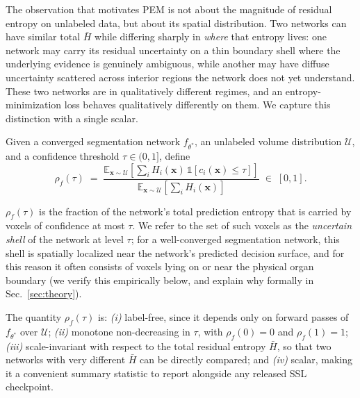 The observation that motivates PEM is not about the magnitude of residual entropy on unlabeled data, but about its spatial distribution. Two networks can have similar total $\bar H$ while differing sharply in \emph{where} that entropy lives: one network may carry its residual uncertainty on a thin boundary shell where the underlying evidence is genuinely ambiguous, while another may have diffuse uncertainty scattered across interior regions the network does not yet understand. These two networks are in qualitatively different regimes, and an entropy-minimization loss behaves qualitatively differently on them. We capture this distinction with a single scalar.

\begin{definition}
\label{def:rho}
Given a converged segmentation network $f_{\theta^*}$, an unlabeled volume distribution $\mathcal{U}$, and a confidence threshold $\tau \in (0, 1]$, define
\begin{equation}
\rho_f(\tau) \;=\; \frac{\mathbb{E}_{\mathbf{x}\sim\mathcal{U}}\!\left[\sum_i H_i(\mathbf{x})\,\mathbb{1}[c_i(\mathbf{x}) \le \tau]\right]}{\mathbb{E}_{\mathbf{x}\sim\mathcal{U}}\!\left[\sum_i H_i(\mathbf{x})\right]} \;\in\; [0, 1].
\label{eq:rho}
\end{equation}
\end{definition}

$\rho_f(\tau)$ is the fraction of the network's total prediction entropy that is carried by voxels of confidence at most $\tau$. We refer to the set of such voxels as the \emph{uncertain shell} of the network at level $\tau$; for a well-converged segmentation network, this shell is spatially localized near the network's predicted decision surface, and for this reason it often consists of voxels lying on or near the physical organ boundary (we verify this empirically below, and explain why formally in Sec.~\ref{sec:theory}).

\begin{proposition}
The quantity $\rho_f(\tau)$ is: \emph{(i)} label-free, since it depends only on forward passes of $f_{\theta^*}$ over $\mathcal{U}$; \emph{(ii)} monotone non-decreasing in $\tau$, with $\rho_f(0)\!=\!0$ and $\rho_f(1)\!=\!1$; \emph{(iii)} scale-invariant with respect to the total residual entropy $\bar H$, so that two networks with very different $\bar H$ can be directly compared; and \emph{(iv)} scalar, making it a convenient summary statistic to report alongside any released SSL checkpoint.
\end{proposition}

